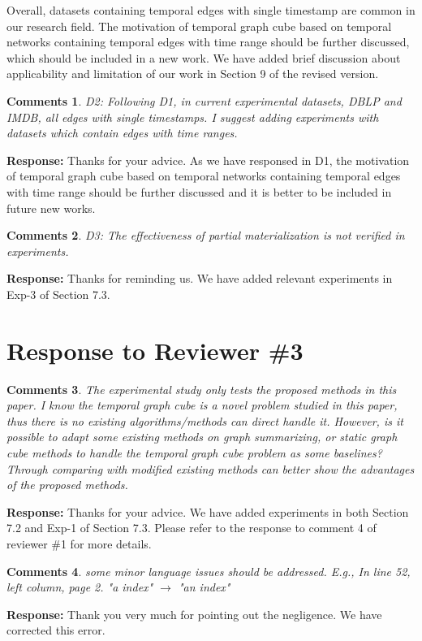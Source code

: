 \documentclass{article}
\newtheorem{Comments}{\textbf{Comments}}
\begin{document}
Overall, datasets containing temporal edges with single timestamp are common in our research field. The motivation of temporal graph cube based on temporal networks containing temporal edges with time range should be further discussed, which should be included in a new work. We have added brief discussion about applicability and limitation of our work in Section 9 of the revised version.

\begin{Comments}
D2: Following D1, in current experimental datasets, DBLP and IMDB, all edges with single timestamps. I suggest adding experiments with datasets which contain edges with time ranges.
\end{Comments}
\noindent \textbf{Response:} Thanks for your advice. As we have responsed in D1, the motivation of temporal graph cube based on temporal networks containing temporal edges with time range should be further discussed and it is better to be included in future new works.

\begin{Comments}
D3: The effectiveness of partial materialization is not verified in experiments.
\end{Comments}
\noindent \textbf{Response:} Thanks for reminding us. We have added relevant experiments in Exp-3 of Section 7.3.

\section{Response to Reviewer \#3}
\setcounter{Comments}{0}
\begin{Comments}
The experimental study only tests the proposed methods in this paper. I know the temporal graph cube is a novel problem studied in this paper, thus there is no existing algorithms/methods can direct handle it. However, is it possible to adapt some existing methods on graph summarizing, or static graph cube methods to handle the temporal graph cube problem as some baselines? Through comparing with modified existing methods can better show the advantages of the proposed methods.
\end{Comments}
\noindent \textbf{Response:} Thanks for your advice. We have added experiments in both Section 7.2 and Exp-1 of Section 7.3. Please refer to the response to comment 4 of reviewer \#1 for more details.


\begin{Comments}
 some minor language issues should be addressed. E.g., In line 52, left column, page 2. "a index" $ \rightarrow $ "an index"
\end{Comments}
\noindent \textbf{Response:} Thank you very much for pointing out the negligence. We have corrected this error.
\end{document}
